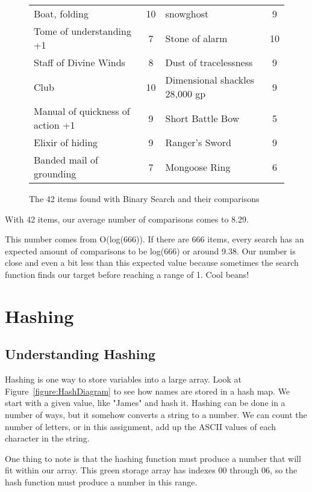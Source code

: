 \documentclass[letterpaper, 10pt,DIV=13]{scrartcl}
\numberwithin{equation}{section} %
\numberwithin{figure}{section} %
\numberwithin{table}{section} %
\begin{document}
\begin{figure}[h]
\begin{tabular}{||lc||lc||}
Boat, folding & 10&snowghost & 9\\
 
Tome of understanding +1 & 7&Stone of alarm & 10\\
 
Staff of Divine Winds & 8&Dust of tracelessness & 9\\
 
Club & 10&Dimensional shackles    28,000 gp & 9\\
 
Manual of quickness of action +1 & 9&Short Battle Bow & 5\\
 
Elixir of hiding & 9&Ranger's Sword & 9\\
 
Banded mail of grounding & 7&Mongoose Ring & 6\\
 



     \hline
    \end{tabular}
    \caption{The 42 items found with Binary Search and their comparisons}
    \label{figure:BinaryResults}
\end{figure}


With 42 items, our average number of comparisons comes to 8.29. 

This number comes from O(log(666)). If there are 666 items, every search has an expected amount of comparisons to be log(666) or around 9.38. Our number is close and even a bit less than this expected value because sometimes the search function finds our target before reaching a range of 1. Cool beans!


\pagebreak

\section{Hashing}
\subsection{Understanding Hashing}
Hashing is one way to store variables into a large array. Look at Figure~\ref{figure:HashDiagram} to see how names are stored in a hash map. We start with a given value, like "James" and hash it. Hashing can be done in a number of ways, but it somehow converts a string to a number. We can count the number of letters, or in this assignment, add up the ASCII values of each character in the string. 

One thing to note is that the hashing function must produce a number that will fit within our array. This green storage array has indexes 00 through 06, so the hash function must produce a number in this range.
\end{document}
